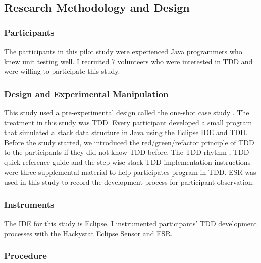 \subsection{Research Methodology and Design}

\subsubsection{Participants}
The participants in this pilot study were experienced Java programmers
who knew unit testing well. I recruited 7 volunteers who were interested
in TDD and were willing to participate this study.

\subsubsection{Design and Experimental Manipulation}
This study used a pre-experimental design called the one-shot case
study \cite{Creswell:03}. The treatment in this study was TDD. Every
participant developed a small program that simulated a stack data
structure in Java using the Eclipse IDE and TDD. Before the study 
started, we introduced the red/green/refactor principle of TDD to 
the participants if they did not know TDD before. The TDD rhythm 
\cite{TDDRhythm}, TDD quick reference guide \cite{TDDQuickReference}
and the step-wise stack TDD implementation instructions were three 
supplemental material to help participates program in TDD. ESR
was used in this study to record the development process for participant
observation.

\subsubsection{Instruments}
The IDE for this study is Eclipse. I instrumented participants' TDD
development processes with the Hackystat Eclipse Sensor and ESR.

\subsubsection{Procedure}

